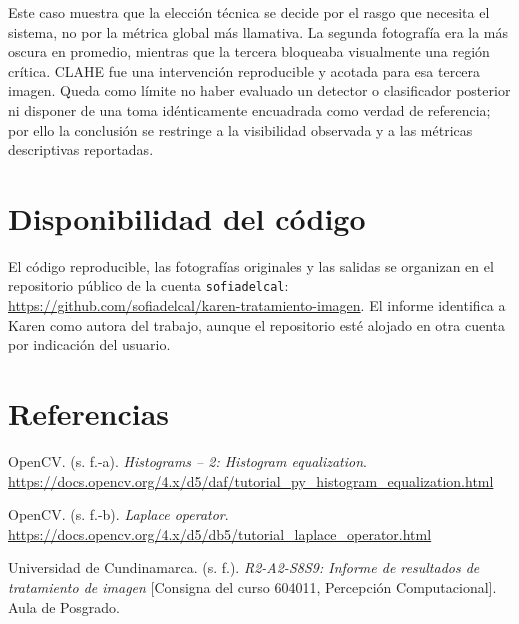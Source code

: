 \documentclass[12pt,letterpaper]{article}
\newcommand{\refapa}[1]{\par\noindent\hangindent=0.5in\hangafter=1 #1\par}
\begin{document}
Este caso muestra que la elección técnica se decide por el rasgo que necesita el sistema, no por la métrica global más llamativa. La segunda fotografía era la más oscura en promedio, mientras que la tercera bloqueaba visualmente una región crítica. CLAHE fue una intervención reproducible y acotada para esa tercera imagen. Queda como límite no haber evaluado un detector o clasificador posterior ni disponer de una toma idénticamente encuadrada como verdad de referencia; por ello la conclusión se restringe a la visibilidad observada y a las métricas descriptivas reportadas.

\section{Disponibilidad del código}
El código reproducible, las fotografías originales y las salidas se organizan en el repositorio público de la cuenta \texttt{sofiadelcal}: \url{https://github.com/sofiadelcal/karen-tratamiento-imagen}. El informe identifica a Karen como autora del trabajo, aunque el repositorio esté alojado en otra cuenta por indicación del usuario.

\newpage
\section{Referencias}
\refapa{OpenCV. (s. f.-a). \textit{Histograms -- 2: Histogram equalization}. \url{https://docs.opencv.org/4.x/d5/daf/tutorial_py_histogram_equalization.html}}
\refapa{OpenCV. (s. f.-b). \textit{Laplace operator}. \url{https://docs.opencv.org/4.x/d5/db5/tutorial_laplace_operator.html}}
\refapa{Universidad de Cundinamarca. (s. f.). \textit{R2-A2-S8S9: Informe de resultados de tratamiento de imagen} [Consigna del curso 604011, Percepción Computacional]. Aula de Posgrado.}
\end{document}
